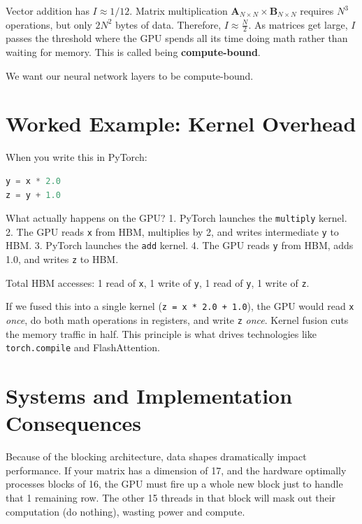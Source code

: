 Vector addition has $I \approx 1/12$. 
Matrix multiplication $\mathbf{A}_{N \times N} \times \mathbf{B}_{N \times N}$ requires $N^3$ operations, but only $2N^2$ bytes of data. Therefore, $I \approx \frac{N}{2}$. As matrices get large, $I$ passes the threshold where the GPU spends all its time doing math rather than waiting for memory. This is called being \textbf{compute-bound}.

We want our neural network layers to be compute-bound. 

\section{Worked Example: Kernel Overhead}
\label{ch:04:sec:example}

When you write this in PyTorch:
\begin{lstlisting}[language=Python]
y = x * 2.0
z = y + 1.0
\end{lstlisting}

What actually happens on the GPU?
1. PyTorch launches the \texttt{multiply} kernel.
2. The GPU reads \texttt{x} from HBM, multiplies by 2, and writes intermediate \texttt{y} to HBM.
3. PyTorch launches the \texttt{add} kernel.
4. The GPU reads \texttt{y} from HBM, adds 1.0, and writes \texttt{z} to HBM.

Total HBM accesses: 1 read of \texttt{x}, 1 write of \texttt{y}, 1 read of \texttt{y}, 1 write of \texttt{z}. 

If we fused this into a single kernel (\texttt{z = x * 2.0 + 1.0}), the GPU would read \texttt{x} \emph{once}, do both math operations in registers, and write \texttt{z} \emph{once}. Kernel fusion cuts the memory traffic in half. This principle is what drives technologies like \texttt{torch.compile} and FlashAttention.

\section{Systems and Implementation Consequences}
\label{ch:04:sec:systems}

Because of the blocking architecture, data shapes dramatically impact performance. 
If your matrix has a dimension of 17, and the hardware optimally processes blocks of 16, the GPU must fire up a whole new block just to handle that 1 remaining row. The other 15 threads in that block will mask out their computation (do nothing), wasting power and compute.

